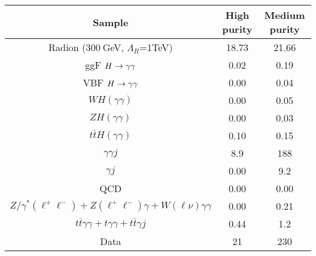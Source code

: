 \begin{tabular}{|c|c|c|}
\hline
Sample & High purity & Medium purity\\
\hline
Radion (300$~$GeV, $\Lambda_R$=1TeV)  & 18.73 & 21.66     \\
\hline
ggF $H\to\gamma\gamma$                &  0.02  &  0.19 \\
VBF $H\to\gamma\gamma$                &  0.00  &  0.04 \\
$WH(\gamma\gamma)$        &  0.00  &  0.05 \\
$ZH(\gamma\gamma)$        &  0.00  &  0.03 \\
$t\bar{t}H(\gamma\gamma)$ &  0.10  &  0.15 \\
\hline
$\gamma\gamma j$                      & 8.9  &  188  \\
$\gamma j$                            & 0.00 &  9.2  \\ 
QCD                                   & 0.00 &  0.00 \\ 
$Z/\gamma^*(\ell^+\ell^-) + Z(\ell^+\ell^-)\gamma + W(\ell\nu)\gamma\gamma$ & 0.00 &  0.21 \\
$t\bar{t}\gamma\gamma + t\gamma\gamma + t\bar{t}\gamma j$ & 0.44 &  1.2  \\
\hline
Data                                  & 21 & 230 \\
\hline
\end{tabular}
